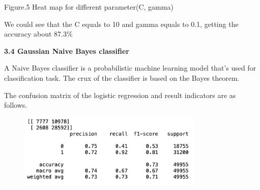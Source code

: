 \documentclass[12pt]{article}
\begin{document}

\par

\begin{Center}
{\fontsize{8pt}{9.6pt}\selectfont Figure.5 Heat map for different parameter(C, gamma)\par}
\end{Center}\par

\begin{justify}
\textcolor[HTML]{222222}{We could see that the C equals to 10 and gamma equals to 0.1, getting the accuracy about 87.3$\%$ }
\end{justify}\par


\vspace{\baselineskip}
\textbf{3.4 Gaussian Naive Bayes classifier}\par

\begin{justify}
\textcolor[HTML]{222222}{A Naive Bayes classifier is a probabilistic machine learning model that’s used for classification task. The crux of the classifier is based on the Bayes theorem.}
\end{justify}\par

\begin{justify}
\textcolor[HTML]{222222}{The confusion matrix of the logistic regression and result indicators are as follows.}
\end{justify}\par


\vspace{\baselineskip}



\begin{figure}[H]
	\begin{Center}
		\includegraphics[width=3.48in,height=1.41in]{./media/image8.png}
	\end{Center}
\end{figure}
\end{document}
